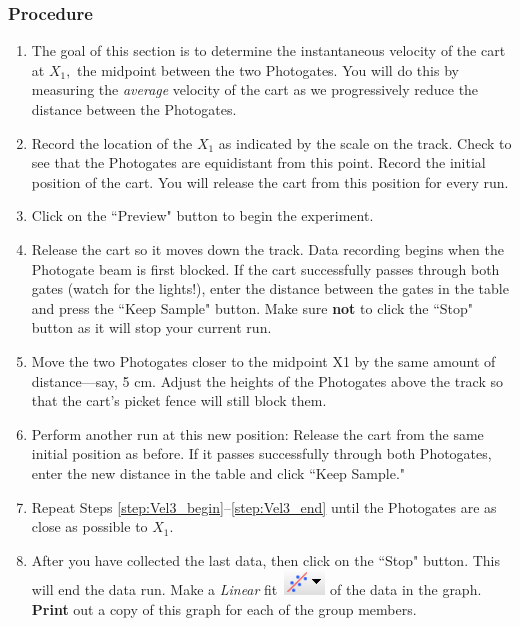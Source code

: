 \documentclass[main.tex]{subfiles}
\begin{document}
\subsubsection*{Procedure}
\begin{enumerate}
\item
The goal of this section is to determine the instantaneous velocity of the cart at $X_1,$ the midpoint between the two Photogates. You will do this by measuring the \emph{average} velocity of the cart as we progressively reduce the distance between the Photogates.
\item
Record the location of the $X_1$ as indicated by the scale on the track. Check to see that the Photogates are equidistant from this point. Record the initial position of the cart. You will release the cart from this position for every run.
\item
Click on the ``Preview" button to begin the experiment.
\item
Release the cart so it moves down the track. Data recording begins when the Photogate beam is first blocked. If the cart successfully passes through both gates (watch for the lights!), enter the distance between the gates in the table and press the ``Keep Sample" button. Make sure \textbf{not} to click the ``Stop" button as it will stop your current run.
\item \label{step:Vel3_begin}
Move the two Photogates closer to the midpoint X1 by the same amount of distance---say, 5 cm. Adjust the heights of the Photogates above the track so that the cart's picket fence will still block them.
\item \label{step:Vel3_end}
Perform another run at this new position: Release the cart from the same initial position as before. If it passes successfully through both Photogates, enter the new distance in the table and click ``Keep Sample."
\item
Repeat Steps \ref{step:Vel3_begin}--\ref{step:Vel3_end} until the Photogates are as close as possible to $X_1.$
\item
After you have collected the last data, then click on the ``Stop" button. This will end the data run. Make a \emph{Linear} fit~\includegraphics{Curve_Fit} of the data in the graph. \textbf{Print} out a copy of this graph for each of the group members.
\end{enumerate}
\end{document}
